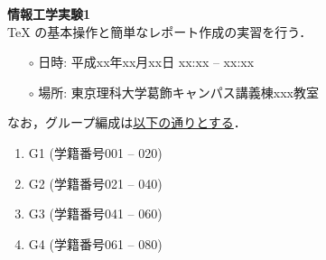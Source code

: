 \documentclass{article}
\begin{document}
{\Large \bf 情報工学実験1}\\

\TeX{} の基本操作と簡単なレポート作成の実習を行う．

\begin{itemize}
    \item[$\circ$] 日時: 平成xx年xx月xx日 xx:xx -- xx:xx
    \item[$\circ$] 場所: 東京理科大学葛飾キャンパス講義棟xxx教室
\end{itemize}

なお，グループ編成は\underline{以下の通りとする}．

\begin{enumerate}
    \item G1 (学籍番号001 -- 020)
    \item G2 (学籍番号021 -- 040)
    \item G3 (学籍番号041 -- 060)
    \item G4 (学籍番号061 -- 080)
\end{enumerate}
\end{document}
